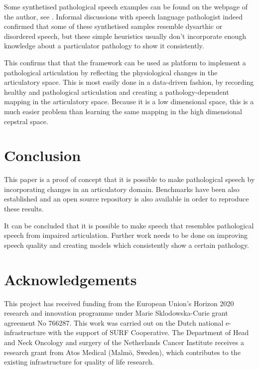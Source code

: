 \documentclass[a4paper]{article}
\begin{document}
Some synthetised pathological speech examples can be found on the webpage of the
author, see \cite{Speech2019}.
Informal discussions with speech language pathologist indeed confirmed
that some of these synthetised samples resemble dysarthic or disordered speech,
but these simple heuristics usually don't incorporate enough knowledge
about a particulator pathology to show it consistently.

This confirms that that the framework can be used as platform to implement a
pathological articulation by reflecting the physiological changes in the articulatory
space. This is most easily done in a data-driven fashion, by recording healthy
and pathological articulation and creating a pathology-dependent mapping
in the articulatory space. Because it is a low dimensional space, this
is a much easier problem than learning the same mapping in the high dimensional cepstral space.

\section{Conclusion}

This paper is a proof of concept that it is possible to make pathological
speech by incorporating changes in an articulatory domain. Benchmarks
have been also established and an open source repository is also available
in order to reproduce these results. 

It can be concluded that it is possible to make speech that resembles
pathological speech from impaired articulation. Further work needs to be done on improving
speech quality and creating models which consistently show a certain
pathology.

\section{Acknowledgements}
This project has received funding from the European Union's Horizon
2020 research and innovation programme under Marie Sklodowska-Curie
grant agreement No 766287.
This work was carried out on the Dutch national e-infrastructure with the support of SURF Cooperative.
The Department of Head and Neck Oncology and surgery of the Netherlands
Cancer Institute receives a research grant from Atos Medical (Malmö,
Sweden), which contributes to the existing infrastructure for quality of
life research.




\end{document}
